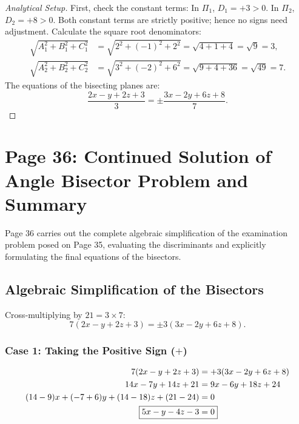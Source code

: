 \begin{proof}[Analytical Setup]
First, check the constant terms:
In $\Pi_1$, $D_1 = +3 > 0$.
In $\Pi_2$, $D_2 = +8 > 0$.
Both constant terms are strictly positive; hence no signs need adjustment.
Calculate the square root denominators:
\begin{align}
    \sqrt{A_1^2 + B_1^2 + C_1^2} &= \sqrt{2^2 + (-1)^2 + 2^2} = \sqrt{4 + 1 + 4} = \sqrt{9} = 3, \\
    \sqrt{A_2^2 + B_2^2 + C_2^2} &= \sqrt{3^2 + (-2)^2 + 6^2} = \sqrt{9 + 4 + 36} = \sqrt{49} = 7.
\end{align}
The equations of the bisecting planes are:
\begin{equation}
    \frac{2x - y + 2z + 3}{3} = \pm \frac{3x - 2y + 6z + 8}{7}.
\end{equation}
\end{proof}

\section{Page 36: Continued Solution of Angle Bisector Problem and Summary}
\label{sec:page36}

\begin{conceptbox}
Page 36 carries out the complete algebraic simplification of the examination problem posed on Page 35, evaluating the discriminants and explicitly formulating the final equations of the bisectors.
\end{conceptbox}

\subsection{Algebraic Simplification of the Bisectors}
Cross-multiplying by $21 = 3 \times 7$:
\begin{equation}
    7(2x - y + 2z + 3) = \pm 3(3x - 2y + 6z + 8).
\end{equation}

\subsubsection{Case 1: Taking the Positive Sign ($+$)}
\begin{align}
    7(2x - y + 2z + 3) &= +3(3x - 2y + 6z + 8) \nonumber\\
    14x - 7y + 14z + 21 &= 9x - 6y + 18z + 24 \nonumber\\
    (14 - 9)x + (-7 + 6)y + (14 - 18)z + (21 - 24) &= 0 \nonumber\\
    \Aboxed{5x - y - 4z - 3 &= 0} \label{eq:bis_plus}
\end{align}

